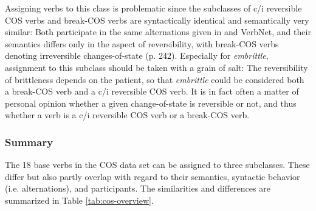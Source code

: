 \begin{exe}
  \ex \label{ex:bendres} 
  \z
\end{exe}

\noindent Assigning verbs to this class is problematic since the subclasses of c/i reversible COS verbs and break-COS verbs are syntactically identical and semantically very similar: Both participate in the same alternations given in \citet{Levin.1993} and VerbNet, and their semantics differs only in the aspect of reversibility, with break-COS verbs denoting irreversible changes-of-state (p. 242). 
Especially for \textit{embrittle}, assignment to this subclass should be taken with a grain of salt: The reversibility of brittleness depends on the patient, so that \textit{embrittle} could be considered both a break-COS verb and a c/i reversible COS verb. It is in fact often a matter of personal opinion whether a given change-of-state is reversible or not, and thus whether a verb is a c/i reversible COS verb or a break-COS verb.

\subsubsection{{Summary}}
\label{sec:cos-input-VN-sum}

The 18 base verbs in the COS data set can be assigned to three subclasses. These differ but also partly overlap with regard to their semantics, syntactic behavior (i.e. alternations), and participants. The similarities and differences are summarized in Table \ref{tab:cos-overview}. 

